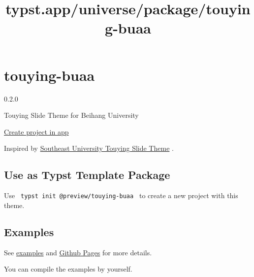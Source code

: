 \title{typst.app/universe/package/touying-buaa}

\label{banner}
\label{template-thumbnail}

\section{touying-buaa}\label{touying-buaa}

{ 0.2.0 }

Touying Slide Theme for Beihang University

\href{/app?template=touying-buaa&version=0.2.0}{Create project in app}

\label{readme}
Inspired by
\href{https://github.com/QuadnucYard/touying-theme-seu}{Southeast
University Touying Slide Theme} .

\subsection{Use as Typst Template
Package}\label{use-as-typst-template-package}

Use \texttt{\ typst\ init\ @preview/touying-buaa\ } to create a new
project with this theme.

\begin{Shaded}
\begin{Highlighting}[]
\end{Highlighting}
\end{Shaded}

\subsection{Examples}\label{examples}

See
\href{https://github.com/typst/packages/raw/main/packages/preview/touying-buaa/0.2.0/examples}{examples}
and \href{https://coekjan.github.io/touying-buaa}{Github Pages} for more
details.

You can compile the examples by yourself.

\begin{Shaded}
\begin{Highlighting}[]
\end{Highlighting}
\end{Shaded}

